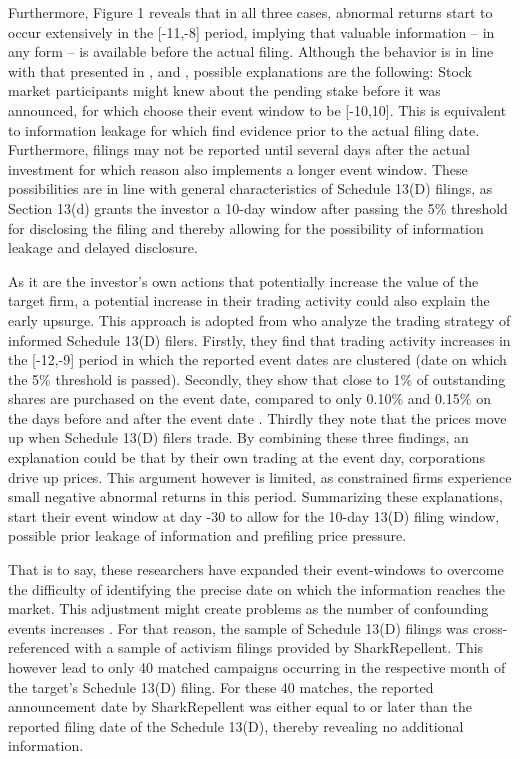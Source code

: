 \documentclass[12pt]{article}
\begin{document}
Furthermore, Figure 1 reveals that in all three cases, abnormal returns start to occur extensively in the [-11,-8] period, implying that valuable information -- in any form -- is available before the actual filing. Although the behavior is in line with that presented in \citet[p.1563]{Collin-Dufresne2015}, \citet[p.370]{Greenwood2009} and \citet[p.1756]{Brav2008}, possible explanations are the following: Stock market participants might knew about the pending stake before it was announced, for which \citet[p.2802]{Allen2000} choose their event window to be [-10,10]. This is equivalent to information leakage for which \citet[p.31]{Brigida2012} find evidence prior to the actual filing date. Furthermore, filings may not be reported until several days after the actual investment for which reason \citet[p.87]{Liao2014} also implements a longer event window. These possibilities are in line with general characteristics of Schedule 13(D) filings, as Section 13(d) grants the investor a 10-day window after passing the 5\% threshold for disclosing the filing and thereby allowing for the possibility of information leakage and delayed disclosure.\par
As it are the investor's own actions that potentially increase the value of the target firm, a potential increase in their trading activity could also explain the early upsurge. This approach is adopted from  \citet[p.1561]{Collin-Dufresne2015} who analyze the trading strategy of informed Schedule 13(D) filers. Firstly, they find that trading activity increases in the [-12,-9] period in which the reported event dates are clustered (date on which the 5\% threshold is passed). Secondly, they show that close to 1\% of outstanding shares are purchased on the event date, compared to only 0.10\% and 0.15\% on the days before and after the event date \citep[p.1561]{Collin-Dufresne2015}. Thirdly they note that the prices move up when Schedule 13(D) filers trade. By combining these three findings, an explanation could be that by their own trading at the event day, corporations drive up prices. This argument however is limited, as constrained firms experience small negative abnormal returns in this period. Summarizing these explanations, \citet[p.207]{Klein2009} start their event window at day -30 to allow for the 10-day 13(D) filing window, possible prior leakage of information and prefiling price pressure.\par
That is to say, these researchers have expanded their event-windows to overcome the difficulty of identifying the precise date on which the information reaches the market. This adjustment might create problems as the number of confounding events increases \citep[p.352]{mcwilliams1999}. For that reason, the sample of Schedule 13(D) filings was cross-referenced with a sample of activism filings provided by SharkRepellent. This however lead to only 40 matched campaigns occurring in the respective month of the target's Schedule 13(D) filing. For these 40 matches, the reported announcement date by SharkRepellent was either equal to or later than the reported filing date of the Schedule 13(D), thereby revealing no additional information.
\end{document}
